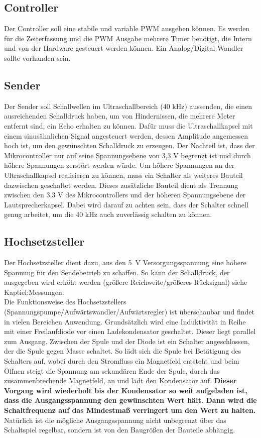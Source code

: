 \subsection{Controller}
Der Controller soll eine stabile und variable PWM ausgeben können. Es werden für die Zeiterfassung und die PWM Ausgabe mehrere Timer benötigt, die Intern und von der Hardware gesteuert werden können. Ein Analog/Digital Wandler sollte vorhanden sein.

\subsection{Sender}
Der Sender soll Schallwellen im Ultraschallbereich (40 kHz) aussenden, die einen ausreichenden Schalldruck haben, um von Hindernissen, die mehrere Meter entfernt sind, ein Echo erhalten zu können.
Dafür muss die Ultraschallkapsel mit einem sinusähnlichen Signal angesteuert werden, dessen Amplitude angemessen hoch ist, um den gewünschten Schalldruck zu erzeugen. Der Nachteil ist, dass der Mikrocontroller nur auf seine Spannungsebene von 3,3 V begrenzt ist und durch höhere Spannungen zerstört werden würde.
Um höhere Spannungen an der Ultraschallkapsel realisieren zu können, muss ein Schalter als weiteres Bauteil dazwischen geschaltet werden. Dieses zusätzliche Bauteil dient als Trennung zwischen den 3,3 V des Mikrocontrollers und der höheren Spannungsebene der Lautsprecherkapsel. Dabei wird darauf zu achten sein, dass der Schalter schnell genug arbeitet, um die 40 kHz auch zuverlässig schalten zu können.

\subsection{Hochsetzsteller}
Der Hochsetzsteller dient dazu, aus den 5~V Versorgungsspannung eine höhere Spannung für den Sendebetrieb zu schaffen. So kann der Schalldruck, der ausgegeben wird erhöht werden (größere Reichweite/größeres Rücksignal) siehe Kaptiel:Messungen.\\%
Die Funktionsweise des Hochsetzstellers (Spannungspumpe/Aufwärtswandler/Aufwärtsregler) ist überschaubar und findet in vielen Bereichen Anwendung. Grundsätzlich wird eine Induktivität in Reihe mit einer Freilaufdiode vor einen Ladekondensator geschaltet. Dieser liegt parallel zum Ausgang. Zwischen der Spule und der Diode ist ein Schalter angeschlossen, der die Spule gegen Masse schaltet. So lädt sich die Spule bei Betätigung des Schalters auf, wobei durch den Stromfluss ein Magnetfeld entsteht und beim Öffnen steigt die Spannung am sekundären Ende der Spule, durch das zusammenbrechende Magnetfeld, an und lädt den Kondensator auf. \textbf{Dieser Vorgang wird wiederholt bis der Kondensator so weit aufgeladen ist, dass die Ausgangsspannung den gewünschten Wert hält. Dann wird die Schaltfrequenz auf das Mindestmaß verringert um den Wert zu halten.} Natürlich ist die mögliche Ausgangsspannung nicht unbegrenzt über das Schaltspiel regelbar, sondern ist von den Baugrößen der Bauteile abhängig. 
